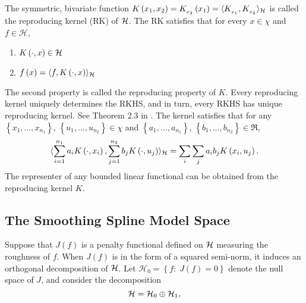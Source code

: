 \bigskip

The symmetric, bivariate function $K\left(x_1, x_2 \right) = K_{_{x_2 }}\left(x_1\right) = \langle K_{_{x_1}}, K_{_{x_2}} \rangle_{\mathcal{H}}$ is called the reproducing kernel (RK) of $\mathcal{H}$. The RK satisfies that for every $x \in \chi$ and $f \in \mathcal{H}$,

\begin{enumerate}
\item $K\left(\cdot, x \right) \in \mathcal{H}$ 
\item $f\left(x\right) = \langle f, K\left(\cdot, x\right)\rangle_{\mathcal{H}}$\label{rkhs-reproducing-property}
\end{enumerate}
\noindent
The second property is called the reproducing property of $K$. Every reproducing kernel uniquely determines the RKHS, and in turn, every RKHS has unique reproducing kernel. See Theorem 2.3 in \cite{gu2013smoothing}. The kernel satisfies that for any $\left\{x_1,\dots, x_{n_1}\right\}$, $\left\{{u}_1,\dots, {u}_{n_2}\right\} \in \chi$ and $\left\{a_1,\dots, a_{n_1}\right\}$, $\left\{b_1,\dots, b_{n_2}\right\} \in \Re$,
\begin{equation}
 \langle\sum_{i = 1}^{n_1} a_i K\left(\cdot, x_i\right), \sum_{j = 1}^{n_2} b_j K\left(\cdot, {u}_j\right) \rangle_{\mathcal{H}} = \sum_i \sum_j a_ib_j K\left(x_i ,u_j\right).
\end{equation}
\noindent
The representer of any bounded linear functional can be obtained from the reproducing kernel $K$. 


\subsection{The Smoothing Spline Model Space}

Suppose that $J\left(f\right)$ is a penalty functional defined on $\mathcal{H}$ measuring the roughness of $f$. When $J\left(f\right)$ is in the form of a squared semi-norm, it induces an orthogonal decomposition of $\mathcal{H}$. Let $\mathcal{H}_0 = \left\{ f:\; J\left(f\right) = 0\right\}$ denote the null space of $J$, and consider the decomposition
\[
\mathcal{H} = \mathcal{H}_0 \oplus \mathcal{H}_1,
\]

